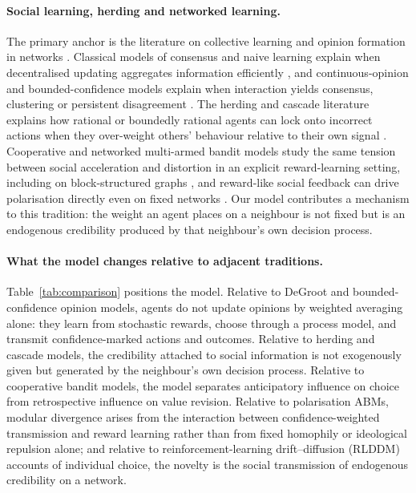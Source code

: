 \documentclass[11pt]{article}
\newcommand{\1}{\mathbf{1}}
\begin{document}
\paragraph{Social learning, herding and networked learning.}
The primary anchor is the literature on collective learning and opinion
formation in networks \citep{GolubSadler2016}. Classical models of consensus and
naive learning explain when decentralised updating aggregates information
efficiently \citep{DeGroot1974,FriedkinJohnsen1990,GolubJackson2010}, and
continuous-opinion and bounded-confidence models explain when interaction yields
consensus, clustering or persistent disagreement
\citep{DeffuantNeauAmblardWeisbuch2000,HegselmannKrause2002,FlacheMasFelicianiChattoeBrownDeffuantHuetLorenz2017}.
The herding and cascade literature explains how rational or boundedly rational
agents can lock onto incorrect actions when they over-weight others' behaviour
relative to their own signal
\citep{Banerjee1992,BikhchandaniHirshleiferWelch1992,TumpPleskacKurvers2020}.
Cooperative and networked multi-armed bandit models study the same tension
between social acceleration and distortion in an explicit reward-learning
setting, including on block-structured graphs
\citep{LandgrenSrivastavaLeonard2021,XuShanGhaffariWangLiuHajiesmaili2025}, and
reward-like social feedback can drive polarisation directly even on fixed
networks \citep{BanischOlbrich2019,HornBanischBatzdorferReitenbachSartoriSchwabeMas2026}.
Our model contributes a mechanism to this tradition: the weight an agent places
on a neighbour is not fixed but is an endogenous credibility produced by that
neighbour's own decision process.

\paragraph{What the model changes relative to adjacent traditions.}
Table~\ref{tab:comparison} positions the model. Relative to DeGroot and
bounded-confidence opinion models, agents do not update opinions by weighted
averaging alone: they learn from stochastic rewards, choose through a process
model, and transmit confidence-marked actions and outcomes. Relative to herding
and cascade models, the credibility attached to social information is not
exogenously given but generated by the neighbour's own decision process.
Relative to cooperative bandit models, the model separates anticipatory
influence on choice from retrospective influence on value revision. Relative to
polarisation ABMs, modular divergence arises from the interaction between
confidence-weighted transmission and reward learning rather than from fixed
homophily or ideological repulsion alone; and relative to
reinforcement-learning drift--diffusion (RLDDM) accounts of individual choice,
the novelty is the social transmission of endogenous credibility on a network.
\end{document}

